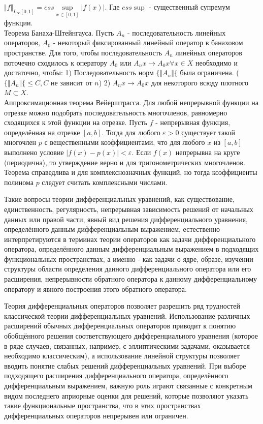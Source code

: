 $ \Vert f \Vert_{L_\infty[0,1]} = ess\sup\limits_{x \in [0,1]} \vert f(x) \vert $. Где $ ess\sup $ - существенный супремум функции. \\
 
\label{theorem Banach Steinhaus}
Теорема Банаха-Штейнгауса. Пусть $ {A_n} $ - последовательность линейных операторов, $ A_0 $ - некоторый фиксированный линейный оператор в банаховом пространстве. Для того, чтобы  последовательность $ {A_n} $ линейных операторов поточечно сходилось к оператору $ A_0 $ или $ A_nx \rightarrow A_0x \forall x \in X $ необходимо и достаточно, чтобы:
1) Последовательность норм $ \lbrace\Vert A_n  \Vert\lbrace $ была ограничена. ($ \lbrace\Vert A_n  \Vert\lbrace \leq C, C $ не зависит от $ n $)
2) $ A_nx \rightarrow A_0x $ для некоторого всюду плотного $ M \subset X $. \\

\label{theorem Weierstrass}
Аппроксимационная теорема Вейерштрасса.
Для любой непрерывной функции на отрезке можно подобрать последовательность многочленов, равномерно сходящихся к этой функции на отрезке.
Пусть $ f $ - непрерывная функция, определённая на отрезке $ [a,b] $. Тогда для любого $ \varepsilon > 0 $ существует такой многочлен $ p $ с вещественными коэффициентами, что для любого $ x $ из $ [a,b] $ выполнено условие $ \vert f(x) - p(x) \vert < \varepsilon $.
Если $ f(x) $ непрерывна на круге (периодична), то утверждение верно и для тригонометрических многочленов.
Теорема справедлива и для комплекснозначных функций, но тогда коэффициенты полинома $ p $ следует считать комплексными числами.

\intro
Такие вопросы теории дифференциальных уравнений, как существование, единственность, регулярность, непрерывная зависимость решений от начальных данных или правой части, явный вид решения дифференциального уравнения, определённого данным дифференциальным выражением, естественно интерпретируются в терминах теории операторов как задачи дифференциального оператора, определённого данным дифференциальным выражением в подходящих функциональных пространствах, а именно - как задачи о ядре, образе, изучении структуры области определения данного дифференциального оператора   или его расширения, непрерывности обратного оператора к данному дифференциальному оператору и явного построения этого обратного оператора.

Теория дифференциальных операторов позволяет разрешить ряд трудностей классической теории дифференциальных уравнений. Использование различных расширений обычных дифференциальных операторов приводит к понятию обобщённого решения соответствующего дифференциального уравнения (которое в ряде случаев, связанных, например, с эллиптическими задачами, оказывается необходимо классическим), а использование линейной структуры позволяет вводить понятие слабых решений дифференциальных уравнений. При выборе подходящего расширения дифференциального оператора, определённого дифференциальным выражением, важную роль играют связанные с конкретным видом последнего априорные оценки для решений, которые позволяют указать такие функциональные пространства, что в этих пространствах дифференциальных операторов непрерывен или ограничен.


